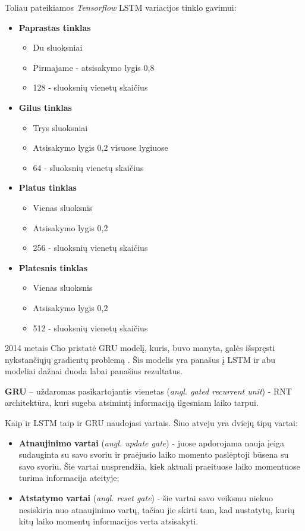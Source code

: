 \documentclass{VUMIFPSbakalaurinis}
\begin{document}
Toliau pateikiamos \textit{Tensorflow} LSTM variacijos tinklo gavimui:
\begin{itemize}
	\item \textbf{Paprastas tinklas}
        \begin{itemize}
        		\item Du sluoksniai
	        	\item Pirmajame - atsisakymo lygis 0,8
        		\item 128 - sluoksnių vienetų skaičius
        \end{itemize}

	\item \textbf{Gilus tinklas}
	\begin{itemize}
		\item Trys sluoksniai
		\item Atsisakymo lygis 0,2 visuose lygiuose
		\item 64 - sluoksnių vienetų skaičius
	\end{itemize}

	\item \textbf{Platus tinklas}
	\begin{itemize}
		\item Vienas sluoksnis
		\item Atsisakymo lygis 0,2
		\item 256 - sluoksnių vienetų skaičius	
	\end{itemize}

	\item \textbf{Platesnis tinklas}
	\begin{itemize}
		\item Vienas sluoksnis
		\item Atsisakymo lygis 0,2
		\item 512 - sluoksnių vienetų skaičius
	\end{itemize}
\end{itemize}


2014 metais Cho pristatė GRU modelį, kuris, buvo manyta, galės išspręsti nykstančiųjų gradientų problemą \cite{DBLP:journals/corr/ChoMGBSB14}. Šis modelis yra panašus į LSTM ir abu modeliai dažnai duoda labai panašius rezultatus.

\textbf{GRU} – uždaromas pasikartojantis vienetas (\textit{angl. gated recurrent unit}) - RNT architektūra, kuri sugeba atsimintį informaciją ilgesniam laiko tarpui. 

Kaip ir LSTM taip ir GRU naudojasi vartais. Šiuo atveju yra dviejų tipų vartai:
\begin{itemize}
	\item \textbf{Atnaujinimo vartai} (\textit{angl. update gate}) - juose apdorojama nauja įeiga sudauginta su savo svoriu ir praėjusio laiko momento paslėptoji būsena su savo svoriu. Šie vartai nusprendžia, kiek aktuali praeituose laiko momentuose turima informacija ateityje;
	\item \textbf{Atstatymo vartai} (\textit{angl. reset gate}) - šie vartai savo veiksmu niekuo nesiskiria nuo atnaujinimo vartų, tačiau jie skirti tam, kad nustatytų, kurių kitų laiko momentų informacijos verta atsisakyti.
\end{itemize}
\end{document}
